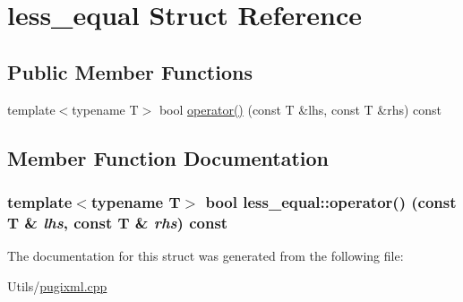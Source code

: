 \hypertarget{structless__equal}{
\section{less\_\-equal Struct Reference}
\label{structless__equal}
}
\subsection*{Public Member Functions}
\begin{CompactItemize}
\item 
template$<$typename T$>$ bool \hyperlink{structless__equal_3c9dc6cda82c38a6ec895ba179b89572}{operator()} (const T \&lhs, const T \&rhs) const 
\end{CompactItemize}


\subsection{Member Function Documentation}
\hypertarget{structless__equal_3c9dc6cda82c38a6ec895ba179b89572}{
\subsubsection[operator()]{\setlength{\rightskip}{0pt plus 5cm}template$<$typename T$>$ bool less\_\-equal::operator() (const T \& {\em lhs}, const T \& {\em rhs}) const}}
\label{structless__equal_3c9dc6cda82c38a6ec895ba179b89572}




The documentation for this struct was generated from the following file:\begin{CompactItemize}
\item 
Utils/\hyperlink{pugixml_8cpp}{pugixml.cpp}\end{CompactItemize}
